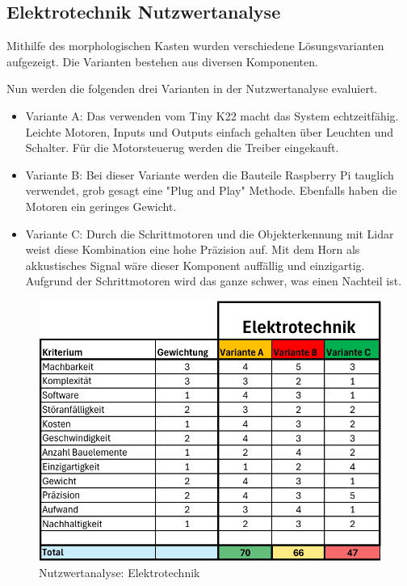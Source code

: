 \subsection{Elektrotechnik Nutzwertanalyse}

Mithilfe des morphologischen Kasten wurden verschiedene Lösungsvarianten aufgezeigt. Die Varianten bestehen aus diversen Komponenten. 


Nun werden die folgenden drei Varianten in der Nutzwertanalyse evaluiert.

\begin{itemize}
    \item Variante A: Das verwenden vom Tiny K22 macht das System echtzeitfähig. Leichte Motoren, Inputs und Outputs einfach gehalten über Leuchten und Schalter. Für die Motorsteuerug werden die Treiber eingekauft.
    \item Variante B: Bei dieser Variante werden die Bauteile Raspberry Pi tauglich verwendet, grob gesagt eine "Plug and Play" Methode. Ebenfalls haben die Motoren ein geringes Gewicht.
    \item Variante C: Durch die Schrittmotoren und die Objekterkennung mit Lidar weist diese Kombination eine hohe Präzision auf. Mit dem Horn als akkustisches Signal wäre dieser Komponent auffällig und einzigartig. Aufgrund der Schrittmotoren wird das ganze schwer, was einen Nachteil ist.
\end{itemize}


\begin{figure}[H]
\centering
\includegraphics[width=\textwidth]{assets/Nutzwertanalyse-ET.pdf}
\caption{Nutzwertanalyse: Elektrotechnik}
\label{fig:nutzwert-ET}
\end{figure}

